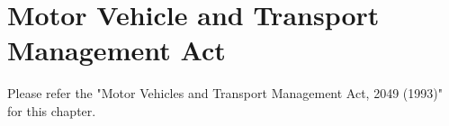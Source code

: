 \chapter{Motor Vehicle and Transport Management Act}
Please refer the "Motor Vehicles and Transport Management Act, 2049 (1993)" for this chapter.